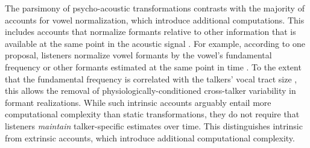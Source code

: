 \documentclass[preprint]{JASA}
\begin{document}
The parsimony of psycho-acoustic transformations contrasts with the majority of accounts for vowel normalization, which introduce additional computations. This includes accounts that normalize formants relative to other information that is available at the same point in the acoustic signal \citep[intrinsic normalization, e.g.,][]{miller1989, peterson1961, syrdal-gopal1986}. For example, according to one proposal, listeners normalize vowel formants by the vowel's fundamental frequency or other formants estimated at the same point in time \citep{syrdal-gopal1986}. To the extent that the fundamental frequency is correlated with the talkers' vocal tract size \citep[for review, see][]{vorperian-kent2007}, this allows the removal of physiologically-conditioned cross-talker variability in formant realizations. While such intrinsic accounts arguably entail more computational complexity than static transformations, they do not require that listeners \emph{maintain} talker-specific estimates over time. This distinguishes intrinsic from extrinsic accounts, which introduce additional computational complexity.
\end{document}
